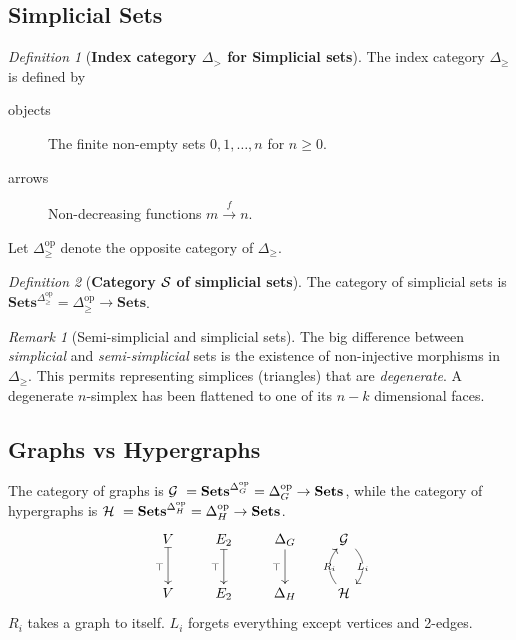 \documentclass[10pt]{article}
\newcommand{\onearrow}[3]{\mbox{$#1 \stackrel{#2}{\longrightarrow} #3$}}
\newcommand{\calG}{\mbox{${\cal G}\ $}}
\newcommand{\calH}{\mbox{${\cal H}\ $}}
\newcommand{\calS}{\mbox{${\cal S}\ $}}
\theoremstyle{remark}
\newtheorem{definition}{Definition}
\newtheorem{remark}{Remark}
\begin{document}
\subsection{Simplicial Sets}

\begin{definition}[\textbf{Index category $\Delta_{>}$ for Simplicial sets}]
The index category $\Delta_{\geq}$ is defined by
\begin{description}
\item [objects] The finite non-empty sets ${0,1, \ldots , n}$ for $n \geq 0$.
\item [arrows] Non-decreasing functions \onearrow{m}{f}{n}.
\end{description}
Let $\Delta_{\geq}^{\text{op}}$ denote the opposite category of $\Delta_{\geq}$.
\end{definition}

\begin{definition}[\textbf{Category \calS of simplicial sets}]
The category of simplicial sets is $\mathbf{Sets}^{\Delta_{\geq}^{\text{op}}} = \Delta_{\geq}^{\text{op}} \rightarrow \mathbf{Sets}$.
\end{definition}

\begin{remark}[Semi-simplicial and simplicial sets]
The big difference between \emph{simplicial} and \emph{semi-simplicial} sets is the existence of non-injective morphisms in $\Delta_{\geq}$. This permits representing simplices (triangles) that are \emph{degenerate}. A degenerate $n$-simplex has been flattened to one of its $n-k$ dimensional faces.
\end{remark}

\subsection{\textbf{Graphs vs Hypergraphs}}

The category of graphs is $\calG = \mathbf{Sets}^{\Delta_G^{\text{op}}} =  \Delta_G^{\text{op}} \rightarrow \mathbf{Sets}$, while the category of hypergraphs is
$\calH = \mathbf{Sets}^{\Delta_H^{\text{op}}} = \Delta_H^{\text{op}} \rightarrow \mathbf{Sets}$.
$$
\xymatrix{
V \ar@{|->}[d]_{\top} & E_2 \ar@{|->}[d]_{\top} &\Delta_G \ar[d]_{\top} & \calG \ar@/^1pc/[d]|{L_i} \\
V                                 & E_2                                  & \Delta_H                       & \calH \ar@/^1pc/[u]|{R_i}
}
$$
$R_i$ takes a graph to itself. $L_i$ forgets everything except vertices and 2-edges.
\end{document}
